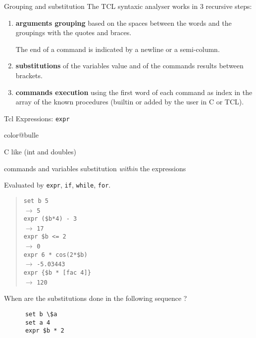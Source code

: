 \documentclass[a4paper,landscape,smooth]{show}
\newcommand{\tclex}[2]{\texttt{#1}\\$\rightarrow$ \texttt{#2}}
\begin{document}
\begin{tslide}{Grouping and substitution}
   \vfill
   The TCL syntaxic analyser works in 3 recursive steps:
   \begin{enumerate}
      \item \textbf{arguments grouping} based on the spaces between
	 the words and the groupings with the quotes and braces.

	 The end of a command is indicated by a newline or a semi-column.

      \item \textbf{substitutions} of the variables value and of the 
	 commands results between brackets.

      \item \textbf{commands execution} using the first word of each
command as index in the array of the known procedures (builtin or
added by the user in C or TCL).
   \end{enumerate}
   \vfill
\end{tslide}


\begin{tslide}{Tcl Expressions: \texttt{expr}}
   \vfill
   \begin{bitemize}{color@bulle}
      \item C like (int and doubles)
      \item commands and variables substitution \emph{within}
	    the expressions
      \item Evaluated by \texttt{expr}, \texttt{if}, \texttt{while},
	    \texttt{for}.
   \end{bitemize}
   \vfill
   \begin{quote}
      \tclex{set b 5}{5}\\
      \tclex{expr (\$b*4) - 3}{17}\\
      \tclex{expr \$b <= 2}{0}\\
      \tclex{expr 6 * cos(2*\$b)}{-5.03443}\\
      \tclex{expr \{\$b * [fac 4]\}}{120}
   \end{quote}
   \vfill
   When are the substitutions done in the following sequence ?
   \begin{verbatim}
      set b \$a
      set a 4
      expr $b * 2
   \end{verbatim} %
   \vfill
\end{tslide}

\end{document}
